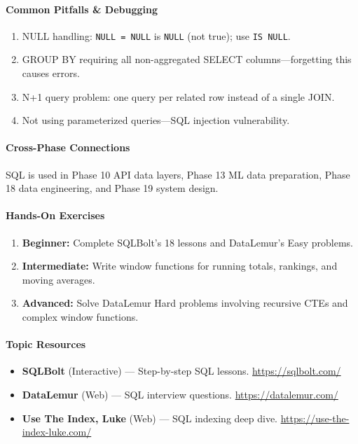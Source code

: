 \documentclass[11pt, a4paper, oneside]{report}
\begin{document}
\paragraph{Common Pitfalls \& Debugging}
\begin{enumerate}[leftmargin=*]
\item NULL handling: \texttt{NULL = NULL} is \texttt{NULL} (not true); use \texttt{IS NULL}.
\item GROUP BY requiring all non-aggregated SELECT columns---forgetting this causes errors.
\item N+1 query problem: one query per related row instead of a single JOIN.
\item Not using parameterized queries---SQL injection vulnerability.
\end{enumerate}

\paragraph{Cross-Phase Connections} SQL is used in Phase 10 API data layers, Phase 13 ML data preparation, Phase 18 data engineering, and Phase 19 system design.

\paragraph{Hands-On Exercises}
\begin{enumerate}[leftmargin=*]
\item \textbf{Beginner:} Complete SQLBolt's 18 lessons and DataLemur's Easy problems.
\item \textbf{Intermediate:} Write window functions for running totals, rankings, and moving averages.
\item \textbf{Advanced:} Solve DataLemur Hard problems involving recursive CTEs and complex window functions.
\end{enumerate}

\paragraph{Topic Resources}
\begin{itemize}[leftmargin=*]
\item \textbf{SQLBolt} (Interactive) --- Step-by-step SQL lessons. \url{https://sqlbolt.com/}
\item \textbf{DataLemur} (Web) --- SQL interview questions. \url{https://datalemur.com/}
\item \textbf{Use The Index, Luke} (Web) --- SQL indexing deep dive. \url{https://use-the-index-luke.com/}
\end{itemize}
\end{document}
